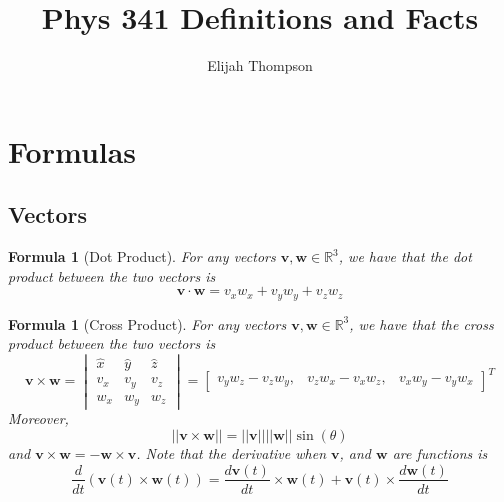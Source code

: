\documentclass[12pt]{article}
\newtheorem{for}[thm]{Formula}
\theoremstyle{definition}
\theoremstyle{remark}
\numberwithin{equation}{section}
\newcommand\R{\mathbb R}    %
\newcommand\B[1]{\textbf{#1}}
\begin{document}

\title{Phys 341 Definitions and Facts}
\author{Elijah Thompson}
\maketitle

\tableofcontents



\section{Formulas}

\subsection{Vectors}


\begin{for}[Dot Product]
        For any vectors $\B{v},\B{w} \in \R^3$, we have that the dot product between the two vectors is 
        \begin{equation}
                \B{v}\cdot\B{w} = v_xw_x+v_yw_y+v_zw_z
        \end{equation}
\end{for}


\vspace{15pt}

\begin{for}[Cross Product]
        For any vectors $\B{v},\B{w} \in \R^3$, we have that the cross product between the two vectors is 
        \begin{equation}
                \B{v}\times\B{w} = \begin{vmatrix} \hat{x} & \hat{y} & \hat{z} \\
                        v_x & v_y & v_z \\
                        w_x & w_y & w_z 
                \end{vmatrix} = 
                        \begin{bmatrix} v_yw_z - v_zw_y, & v_zw_x - v_xw_z, & v_xw_y - v_yw_x
                \end{bmatrix}^T
        \end{equation}
        Moreover, \begin{equation}
                ||\B{v}\times\B{w}|| = ||\B{v}||||\B{w}||\sin(\theta)
        \end{equation}
        and $\B{v}\times \B{w} = -\B{w} \times \B{v}$. Note that the derivative when $\B{v}$, and $\B{w}$ are functions is \begin{equation}
                \frac{d}{dt}(\B{v}(t)\times \B{w}(t)) = \frac{d\B{v}(t)}{dt}\times\B{w}(t) + \B{v}(t)\times \frac{d\B{w}(t)}{dt}
        \end{equation}
\end{for}
\end{document}
